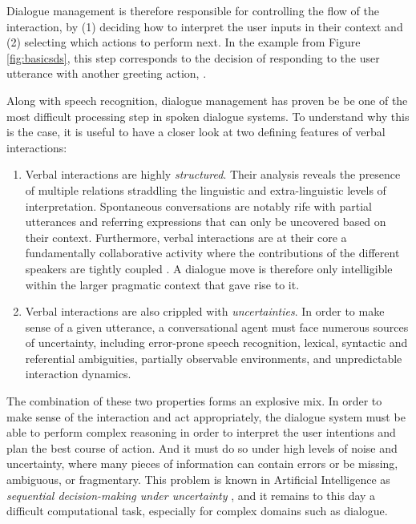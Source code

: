 Dialogue management is therefore responsible for controlling the flow of the interaction, by (1) deciding how to interpret the user inputs in their context and (2) selecting which actions to perform next. In the example from Figure \ref{fig:basicsds}, this step corresponds to the decision of responding to the user utterance  with another greeting action, . 

Along with speech recognition, dialogue management has proven be be one of the most difficult processing step in spoken dialogue systems. To understand why this is the case, it is useful to have a closer look at two defining features of verbal interactions:
\begin{enumerate}
\item Verbal interactions are highly \textit{structured}.  Their analysis reveals the presence of multiple relations straddling the linguistic and extra-linguistic levels of interpretation. Spontaneous conversations are notably rife with partial utterances and referring expressions that can only be uncovered based on their context. Furthermore, verbal interactions are at their core a fundamentally collaborative activity where the contributions of the different speakers are tightly coupled \citep{Clark96,Garrod2004}. A dialogue move is therefore only intelligible within the larger pragmatic context that gave rise to it. 

\item Verbal interactions are also crippled with \textit{uncertainties}.  In order to make sense of a given utterance, a conversational agent must face numerous sources of uncertainty, including error-prone speech recognition, lexical,  syntactic and referential ambiguities, partially observable environments, and unpredictable interaction dynamics.  
\end{enumerate} 

The combination of these two properties forms an explosive mix.  In order to make sense of the interaction and act appropriately, the dialogue system must be able to perform complex reasoning in order to interpret the user intentions and plan the best course of action.  And it must do so under high levels of noise and uncertainty, where many pieces of information can contain errors or be missing, ambiguous, or fragmentary. This problem is known in Artificial Intelligence as \textit{sequential decision-making under uncertainty} \citep{Kaelbling:1998,aima2010}, and it remains to this day a difficult computational task, especially for complex domains such as dialogue. 

